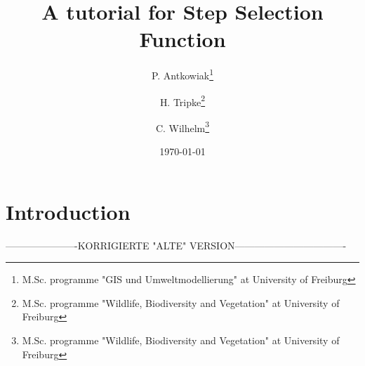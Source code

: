 \documentclass[11pt, a4paper]{article}\usepackage[]{graphicx}\usepackage[]{color}
\begin{document}



\title{A tutorial for Step Selection Function}

\author{P. Antkowiak\thanks{M.Sc. programme "GIS und Umweltmodellierung" at University of Freiburg} \and H. Tripke\thanks{M.Sc. programme "Wildlife, Biodiversity and Vegetation" at University of Freiburg} \and C. Wilhelm\thanks{M.Sc. programme "Wildlife, Biodiversity and Vegetation" at University of Freiburg}}

\date{\today} %

\maketitle


\tableofcontents

\newpage

\section{Introduction}%

----------------------KORRIGIERTE "ALTE" VERSION----------------------------------
\end{document}
